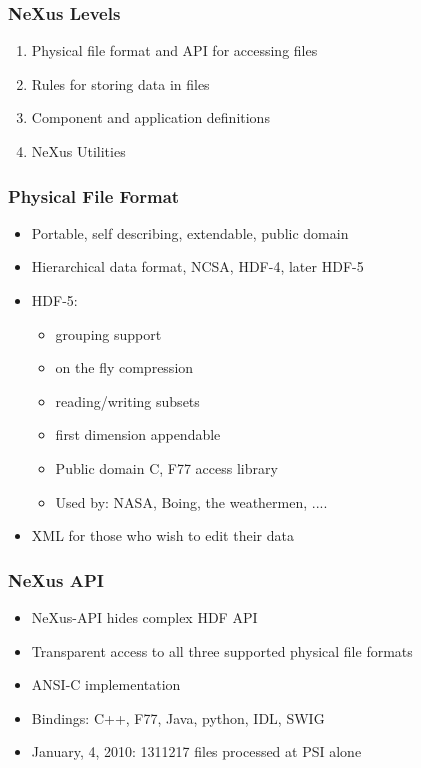 \documentclass{beamer}
\begin{document}
\begin{frame}
 \frametitle{NeXus Levels }
\begin{enumerate}
\item Physical file format and API for accessing files
\item Rules for storing data in files
\item Component and application definitions
\item NeXus Utilities
\end{enumerate}
\end{frame}


\begin{frame} \frametitle{Physical File Format }
\begin{itemize}
\item Portable, self describing, extendable, public domain
\item Hierarchical data format, NCSA, HDF-4, later HDF-5
\item HDF-5:
\begin{itemize}
\item grouping support
\item on the fly compression
\item reading/writing subsets
\item first dimension appendable
\item Public domain C, F77 access library
\item Used by: NASA, Boing, the weathermen, .... 
\end{itemize}
\item XML for those who wish to edit their data
\end{itemize}
\end{frame}


\begin{frame} \frametitle{NeXus API }
\begin{itemize}
\item NeXus-API hides complex HDF API
\item Transparent access to all three supported physical file formats
\item ANSI-C implementation
\item Bindings: C++, F77, Java, python, IDL, SWIG
\item January, 4, 2010: 1311217 files processed at PSI alone
\end{itemize}
\end{frame}
\end{document}

